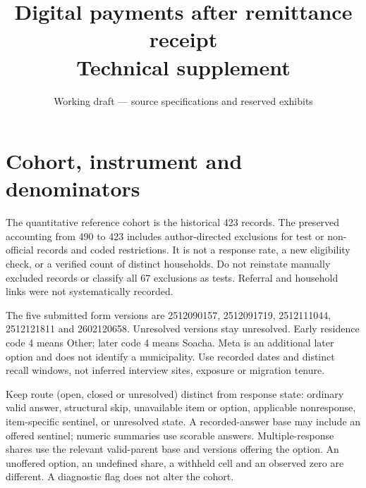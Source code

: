 \documentclass[12pt]{article}
\title{Digital payments after remittance receipt\\ Technical supplement}
\author{}
\date{Working draft --- source specifications and reserved exhibits}
\begin{document}
\maketitle
\section{Cohort, instrument and denominators}
The quantitative reference cohort is the historical 423 records. The preserved accounting from 490 to 423 includes author-directed exclusions for test or non-official records and coded restrictions. It is not a response rate, a new eligibility check, or a verified count of distinct households. Do not reinstate manually excluded records or classify all 67 exclusions as tests. Referral and household links were not systematically recorded.

The five submitted form versions are 2512090157, 2512091719, 2512111044, 2512121811 and 2602120658. Unresolved versions stay unresolved. Early residence code 4 means Other; later code 4 means Soacha. Meta is an additional later option and does not identify a municipality. Use recorded dates and distinct recall windows, not inferred interview sites, exposure or migration tenure.

Keep route (open, closed or unresolved) distinct from response state: ordinary valid answer, structural skip, unavailable item or option, applicable nonresponse, item-specific sentinel, or unresolved state. A recorded-answer base may include an offered sentinel; numeric summaries use scorable answers. Multiple-response shares use the relevant valid-parent base and versions offering the option. An unoffered option, an undefined share, a withheld cell and an observed zero are different. A diagnostic flag does not alter the cohort.
\end{document}
